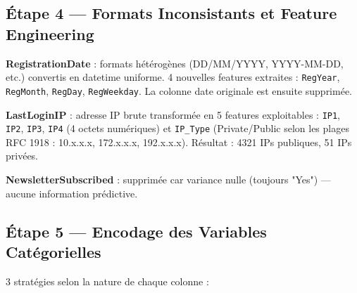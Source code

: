 \documentclass[11pt,a4paper]{article}
\begin{document}
\subsection{Étape 4 — Formats Inconsistants et Feature Engineering}
\textbf{RegistrationDate} : formats hétérogènes (DD/MM/YYYY, YYYY-MM-DD, etc.) convertis en datetime uniforme. 4 nouvelles features extraites : \texttt{RegYear}, \texttt{RegMonth}, \texttt{RegDay}, \texttt{RegWeekday}. La colonne date originale est ensuite supprimée.

\textbf{LastLoginIP} : adresse IP brute transformée en 5 features exploitables : \texttt{IP1}, \texttt{IP2}, \texttt{IP3}, \texttt{IP4} (4 octets numériques) et \texttt{IP\_Type} (Private/Public selon les plages RFC 1918 : 10.x.x.x, 172.x.x.x, 192.x.x.x). Résultat : 4321 IPs publiques, 51 IPs privées.

\textbf{NewsletterSubscribed} : supprimée car variance nulle (toujours "Yes") — aucune information prédictive.
\subsection{Étape 5 — Encodage des Variables Catégorielles}
3 stratégies selon la nature de chaque colonne :
\end{document}
